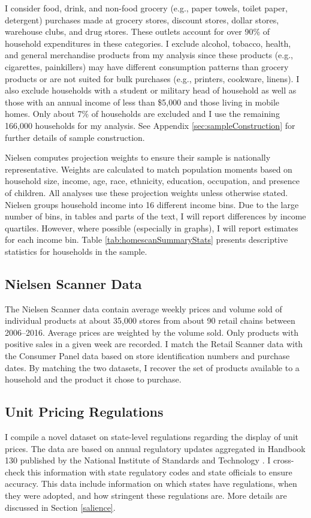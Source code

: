 \documentclass[AER]{AEA_mal}
\begin{document}
I consider food, drink, and non-food grocery (e.g., paper towels, toilet paper, detergent) purchases made at grocery stores, discount stores, dollar stores, warehouse clubs, and drug stores. These outlets account for over 90\% of household expenditures in these categories. I exclude alcohol, tobacco, health, and general merchandise products from my analysis since these products (e.g., cigarettes, painkillers) may have different consumption patterns than grocery products or are not suited for bulk purchases (e.g., printers, cookware, linens). I also exclude households with a student or military head of household as well as those with an annual income of less than \$5,000 and those living in mobile homes. Only about 7\% of households are excluded and I use the remaining 166,000 households for my analysis. See Appendix \ref{sec:sampleConstruction} for further details of sample construction.

Nielsen computes projection weights to ensure their sample is nationally representative. Weights are calculated to match population moments based on household size, income, age, race, ethnicity, education, occupation, and presence of children. All analyses use these projection weights unless otherwise stated. Nielsen groups household income into 16 different income bins. Due to the large number of bins, in tables and parts of the text, I will report differences by income quartiles. However, where possible (especially in graphs), I will report estimates for each income bin. Table \ref{tab:homescanSummaryStats} presents descriptive statistics for households in the sample.



\subsection{Nielsen Scanner Data}
The Nielsen Scanner data contain average weekly prices and volume sold of individual products at about 35,000 stores from about 90 retail chains between 2006--2016. Average prices are weighted by the volume sold. Only products with positive sales in a given week are recorded. I match the Retail Scanner data with the Consumer Panel data based on store identification numbers and purchase dates. By matching the two datasets, I recover the set of products available to a household and the product it chose to purchase.

\subsection{Unit Pricing Regulations}
I compile a novel dataset on state-level regulations regarding the display of unit prices. The data are based on annual regulatory updates aggregated in Handbook 130 published by the National Institute of Standards and Technology \citep{nist130}. I cross-check this information with state regulatory codes and state officials to ensure accuracy. This data include information on which states have regulations, when they were adopted, and how stringent these regulations are. More details are discussed in Section \ref{salience}.
\end{document}
